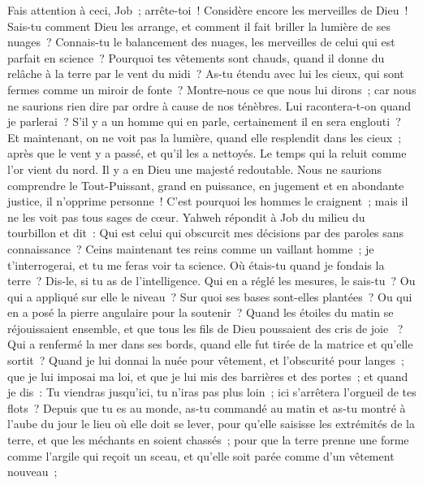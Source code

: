 \begin{multicols}{2}
Fais attention à ceci, Job~; arrête-toi~! Considère encore les merveilles de Dieu~!
Sais-tu comment Dieu les arrange, et comment il fait briller la lumière de ses nuages~?
Connais-tu le balancement des nuages, les merveilles de celui qui est parfait en science~?
Pourquoi tes vêtements sont chauds, quand il donne du relâche à la terre par le vent du midi~? 
As-tu étendu avec lui les cieux, qui sont fermes comme un miroir de fonte~? 
Montre-nous ce que nous lui dirons~; car nous ne saurions rien dire par ordre à cause de nos ténèbres. 
Lui racontera-t-on quand je parlerai~? S'il y a un homme qui en parle, certainement il en sera englouti~?
Et maintenant, on ne voit pas la lumière, quand elle resplendit dans les cieux~; après que le vent y a passé, et qu'il les a nettoyés.
Le temps qui la reluit comme l'or vient du nord. Il y a en Dieu une majesté redoutable.
Nous ne saurions comprendre le Tout-Puissant, grand en puissance, en jugement et en abondante justice, il n'opprime personne~!
C'est pourquoi les hommes le craignent~; mais il ne les voit pas tous sages de cœur.
\VerseOne{}Yahweh répondit à Job du milieu du tourbillon et dit~:
Qui est celui qui obscurcit mes décisions par des paroles sans connaissance~?
Ceins maintenant tes reins comme un vaillant homme~; je t'interrogerai, et tu me feras voir ta science.
Où étais-tu quand je fondais la terre~? Dis-le, si tu as de l'intelligence.
Qui en a réglé les mesures, le sais-tu~? Ou qui a appliqué sur elle le niveau~?
Sur quoi ses bases sont-elles plantées~? Ou qui en a posé la pierre angulaire pour la soutenir~?
Quand les étoiles du matin se réjouissaient ensemble, et que tous les fils de Dieu poussaient des cris de joie ~?
Qui a renfermé la mer dans ses bords, quand elle fut tirée de la matrice et qu'elle sortit~? 
Quand je lui donnai la nuée pour vêtement, et l'obscurité pour langes~;
que je lui imposai ma loi, et que je lui mis des barrières et des portes~;
 et quand je dis~: Tu viendras jusqu'ici, tu n'iras pas plus loin~; ici s'arrêtera l'orgueil de tes flots~?
Depuis que tu es au monde, as-tu commandé au matin et as-tu montré à l'aube du jour le lieu où elle doit se lever,
pour qu'elle saisisse les extrémités de la terre, et que les méchants en soient chassés~;
pour que la terre prenne une forme comme l'argile qui reçoit un sceau, et qu'elle soit parée comme d'un vêtement nouveau~;

\end{multicols}
